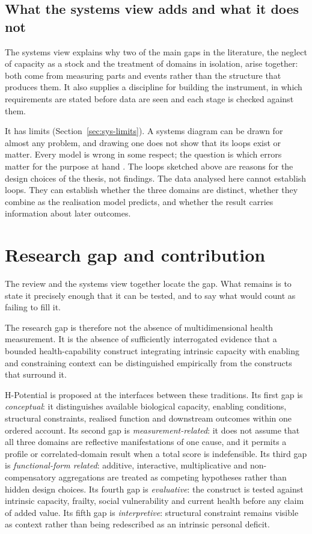 \subsection{What the systems view adds and what it does not}

The systems view explains why two of the main gaps in the literature, the neglect of capacity as a stock and the treatment of domains in isolation, arise together: both come from measuring parts and events rather than the structure that produces them. It also supplies a discipline for building the instrument, in which requirements are stated before data are seen and each stage is checked against them.

It has limits (Section~\ref{sec:sys-limits}). A systems diagram can be drawn for almost any problem, and drawing one does not show that its loops exist or matter. Every model is wrong in some respect; the question is which errors matter for the purpose at hand \citep{box_1976}. The loops sketched above are reasons for the design choices of the thesis, not findings. The data analysed here cannot establish loops. They can establish whether the three domains are distinct, whether they combine as the realisation model predicts, and whether the result carries information about later outcomes.

\section{Research gap and contribution}
\label{sec:intro-gap}

The review and the systems view together locate the gap. What remains is to state it precisely enough that it can be tested, and to say what would count as failing to fill it.

The research gap is therefore not the absence of multidimensional health measurement. It is the absence of sufficiently interrogated evidence that a bounded health-capability construct integrating intrinsic capacity with enabling and constraining context can be distinguished empirically from the constructs that surround it.

H-Potential is proposed at the interfaces between these traditions. Its first gap is
\emph{conceptual}: it distinguishes available biological capacity, enabling
conditions, structural constraints, realised function and downstream outcomes
within one ordered account. Its second gap is \emph{measurement-related}: it
does not assume that all three domains are reflective manifestations of one
cause, and it permits a profile or correlated-domain result when a total score
is indefensible. Its third gap is \emph{functional-form related}: additive,
interactive, multiplicative and non-compensatory aggregations are treated as
competing hypotheses rather than hidden design choices. Its fourth gap is
\emph{evaluative}: the construct is tested against intrinsic capacity, frailty,
social vulnerability and current health before any claim of added value. Its
fifth gap is \emph{interpretive}: structural constraint remains visible as
context rather than being redescribed as an intrinsic personal deficit.

